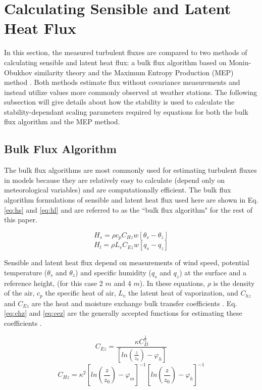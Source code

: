 \section{Calculating Sensible and Latent Heat Flux}
In this section, the measured turbulent fluxes are compared to two methods of calculating sensible and latent heat flux: a bulk flux algorithm based on Monin-Obukhov similarity theory \citep{foken:2008} and the Maximum Entropy Production (MEP) method \citep{zhang:2021, wang:2014, wang:2009}. Both methods estimate flux without covariance measurements and instead utilize values more commonly observed at weather stations. The following subsection will give details about how the stability is used to calculate the stability-dependant scaling parameters required by equations for both the bulk flux algorithm and the MEP method.  

\subsection{Bulk Flux Algorithm}
The bulk flux algorithms are most commonly used for estimating turbulent fluxes \cite{reeves:2021} in models because they are relatively easy to calculate (depend only on meteorological variables) and are computationally efficient. The bulk flux algorithm formulations of sensible and latent heat flux used here are shown in Eq. \ref{eq:hs} and \ref{eq:hl} and are referred to as the ``bulk flux algorithm" for the rest of this paper.

\begin{equation}\label{eq:hs}
H_{s} = \rho c_{p} C_{Hz} w [\theta_{s} - \theta_{z}]
\end{equation}
\begin{equation}\label{eq:hl}
H_{l} = \rho L_{v} C_{Ez} w [q_{s} - q_{z}] 
\end{equation}

Sensible and latent heat flux depend on measurements of wind speed, potential temperature ($\theta_{s}$ and $\theta_{z}$) and specific humidity ($q_{s}$ and $q_{z}$) at the surface and a reference height, (for this case 2 $m$ and 4 $m$). In these equations, $\rho$ is the density of the air, $c_{p}$ the specific heat of air, $L_{v}$ the latent heat of vaporization, and $C_{hz}$ and $C_{Ez}$ are the heat and moisture exchange bulk transfer coefficients \citep{foken:2008, andreas:311}. Eq. \ref{eq:chz} and \ref{eq:cez} are the generally accepted functions for estimating these coefficients \citep{foken:2008}. 

\begin{equation}\label{eq:cez}
C_{Ez} = \frac{\kappa C_{D}^{\frac{1}{2}}}{[ln(\frac{z}{z_{0}})-\varphi_{h}]}
\end{equation}
\begin{equation}\label{eq:chz}
C_{Hz} =  \kappa^{2} \left[ ln \left( \frac{z}{z_{0}} \right) - \varphi_{m} \right] ^{-1} \left[ ln \left( \frac{z}{z_{0}} \right) - \varphi_{h} \right] ^{-1}
\end{equation}

